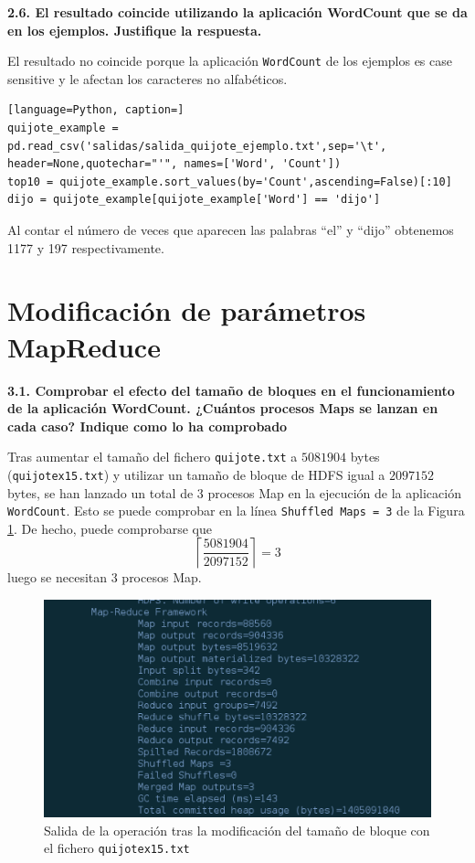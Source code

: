 \documentclass[10pt,swedish, openany]{book}
\begin{document}
\vspace{0.8em}

\textbf{2.6. El resultado coincide utilizando la aplicación WordCount
 que se da en los ejemplos. Justifique la respuesta.}

El resultado no coincide porque la aplicación \texttt{WordCount} de los ejemplos es case sensitive y le afectan los caracteres no alfabéticos. 
\begin{lstlisting}[language=Python, caption=]
quijote_example = pd.read_csv('salidas/salida_quijote_ejemplo.txt',sep='\t', header=None,quotechar="'", names=['Word', 'Count'])
top10 = quijote_example.sort_values(by='Count',ascending=False)[:10]
dijo = quijote_example[quijote_example['Word'] == 'dijo']
\end{lstlisting}
Al contar el número de veces que aparecen las palabras ``el'' y ``dijo'' obtenemos 1177 y 197 respectivamente. 

 

\section{Modificación de parámetros MapReduce}

\textbf{3.1. Comprobar el efecto del tamaño de bloques en el funcionamiento de la aplicación WordCount. ¿Cuántos procesos Maps se lanzan en cada caso? Indique como lo ha comprobado}

Tras aumentar el tamaño del fichero \texttt{quijote.txt} a $5081904$ bytes (\texttt{quijotex15.txt}) y utilizar un tamaño de bloque de HDFS igual a $2097152$ bytes, se han lanzado un total de 3 procesos Map en la ejecución de la aplicación \texttt{WordCount}. Esto se puede comprobar en la línea \texttt{Shuffled Maps = 3} de la Figura \ref{fig:my_label}. De hecho, puede comprobarse que
\begin{equation*}
    \left\lceil\dfrac{5081904}{2097152}\right\rceil = 3
\end{equation*}
luego se necesitan 3 procesos Map. 

\begin{figure}[h]
    \caption{Salida de la operación tras la modificación del tamaño de bloque con el fichero \texttt{quijotex15.txt}}
    \label{fig:my_label}
    \centering
    \includegraphics[width=1\textwidth]{images/salidamapreduce.png}
\end{figure}
\end{document}
